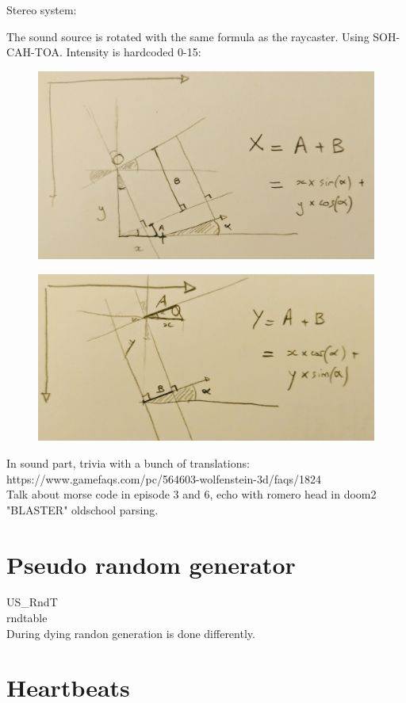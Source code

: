 \par
Stereo system:\\
\par
The sound source is rotated with the same formula as the raycaster. Using SOH-CAH-TOA. Intensity is hardcoded 0-15:\\
\par
\begin{figure}[H]
\centering
 \includegraphics[width=\textwidth]{imgs/audio_y_rotate.png}
 \end{figure}
 \par
 \begin{figure}[H]
\centering
 \includegraphics[width=\textwidth]{imgs/audio_x_rotate.png}
 \end{figure}
\par
In sound part, trivia with a bunch of translations: https://www.gamefaqs.com/pc/564603-wolfenstein-3d/faqs/1824\\
Talk about morse code in episode 3 and 6, echo with romero head in doom2\\
"BLASTER" oldschool parsing.
\section{Pseudo random generator}
US\_RndT\\
rndtable\\
During dying randon generation is done differently.


\section{Heartbeats}
